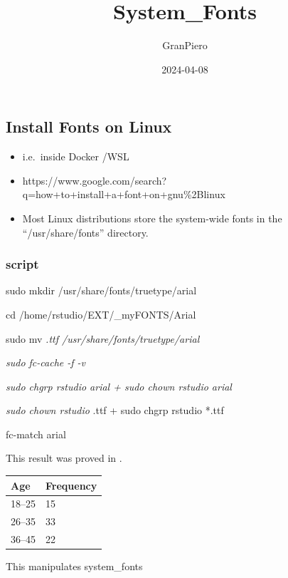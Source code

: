 \documentclass[
  12pt,
  letterpaper,
  DIV=11,
  numbers=noendperiod]{scrartcl}
\title{System\_Fonts}
\author{GranPiero}
\date{2024-04-08}
\begin{document}
\maketitle


\subsection{Install Fonts on Linux}\label{install-fonts-on-linux}

\begin{itemize}
\item
  i.e.~inside Docker /WSL
\item
  https://www.google.com/search?q=how+to+install+a+font+on+gnu\%2Blinux
\item
  Most Linux distributions store the system-wide fonts in the
  ``/usr/share/fonts'' directory.
\end{itemize}

\subsubsection{script}\label{script}

sudo mkdir /usr/share/fonts/truetype/arial

cd /home/rstudio/EXT/\_myFONTS/Arial

sudo mv \emph{.ttf /usr/share/fonts/truetype/arial}

\emph{sudo fc-cache -f -v}

\emph{sudo chgrp rstudio arial + sudo chown rstudio arial}

\emph{sudo chown rstudio} .ttf + sudo chgrp rstudio *.ttf

fc-match arial

This result was proved in \cite{jones.1967}.

\begin{tabular}{|l|l|}\hline
Age & Frequency \\ \hline
18--25  & 15 \\
26--35  & 33 \\
36--45  & 22 \\ \hline
\end{tabular}

This manipulates system\_fonts
\end{document}
